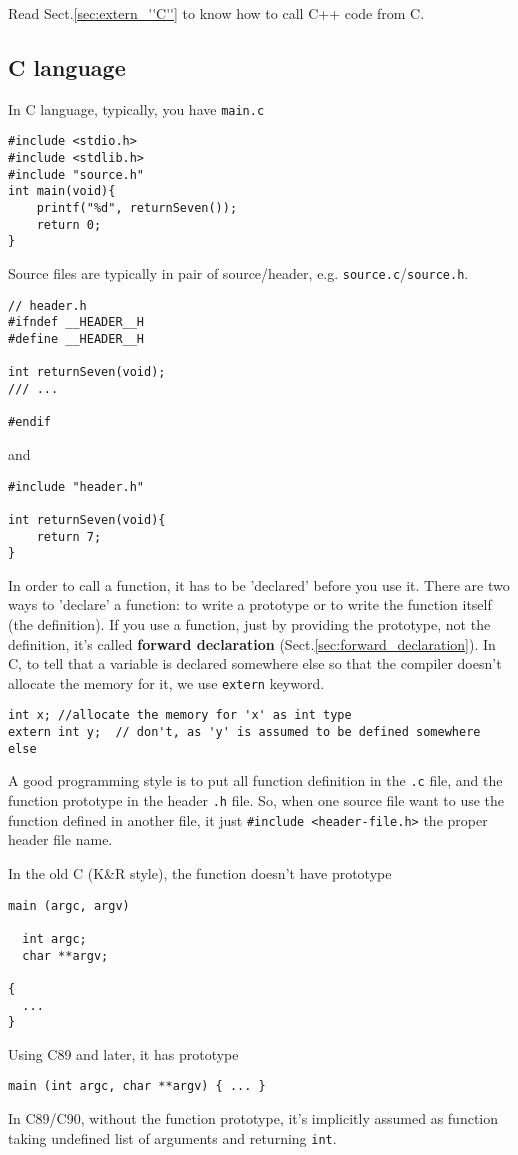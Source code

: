 Read Sect.\ref{sec:extern_''C''} to know how to call C++ code from C.

\subsection{C language} 

In C language, typically, you have \verb!main.c!
\begin{lstlisting}
#include <stdio.h>
#include <stdlib.h>
#include "source.h"
int main(void){
    printf("%d", returnSeven());
    return 0;
}
\end{lstlisting}

Source files are typically in pair of source/header, e.g.
\verb!source.c!/\verb!source.h!.
\begin{verbatim}
// header.h
#ifndef __HEADER__H
#define __HEADER__H

int returnSeven(void);
/// ...

#endif
\end{verbatim}
and
\begin{lstlisting}
#include "header.h"

int returnSeven(void){
    return 7;
}
\end{lstlisting}

In order to call a function, it has to be 'declared' before you use it. There
are two ways to 'declare' a function: to write a prototype or to write the
function itself (the definition). If you use a function, just by providing the
prototype, not the definition, it's called {\bf forward declaration}
(Sect.\ref{sec:forward_declaration}).
In C, to tell that a variable is declared somewhere else so that the compiler doesn't
allocate the memory for it, we use \verb!extern! keyword.
\begin{verbatim}
int x; //allocate the memory for 'x' as int type
extern int y;  // don't, as 'y' is assumed to be defined somewhere else
\end{verbatim}
A good programming style is to put all
function definition in the \verb!.c! file, and the function prototype in the
header \verb!.h! file. So, when one source file want to use the function defined
in another file, it just \verb!#include <header-file.h>! the proper header file
name.

In the old C (K\&R style), the function doesn't have prototype
\begin{lstlisting}
main (argc, argv)

  int argc;
  char **argv;

{
  ...
}
\end{lstlisting}
Using C89 and later, it has prototype
\begin{lstlisting}
main (int argc, char **argv) { ... }
\end{lstlisting}
In C89/C90, without the function prototype, it's implicitly assumed as function
taking undefined list of arguments and returning \verb!int!.


